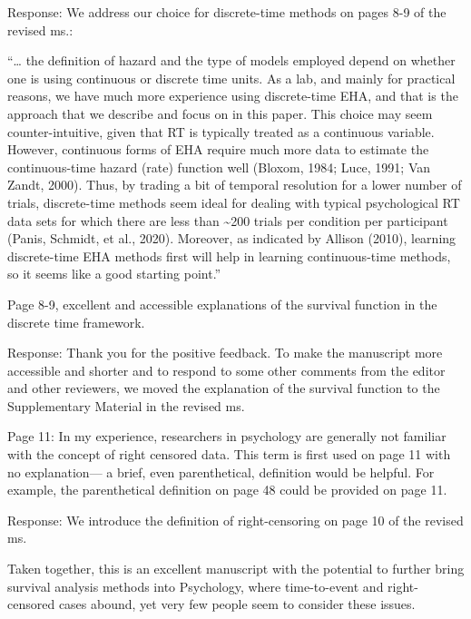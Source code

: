 \documentclass[
]{article}
\renewenvironment{quote}{\begin{leftbar}}{\end{leftbar}}
\begin{document}
Response: We address our choice for discrete-time methods on pages 8-9
of the revised ms.:

``\ldots{} the definition of hazard and the type of models employed
depend on whether one is using continuous or discrete time units. As a
lab, and mainly for practical reasons, we have much more experience
using discrete-time EHA, and that is the approach that we describe and
focus on in this paper. This choice may seem counter-intuitive, given
that RT is typically treated as a continuous variable. However,
continuous forms of EHA require much more data to estimate the
continuous-time hazard (rate) function well (Bloxom, 1984; Luce, 1991;
Van Zandt, 2000). Thus, by trading a bit of temporal resolution for a
lower number of trials, discrete-time methods seem ideal for dealing
with typical psychological RT data sets for which there are less than
\textasciitilde200 trials per condition per participant (Panis, Schmidt,
et al., 2020). Moreover, as indicated by Allison (2010), learning
discrete-time EHA methods first will help in learning continuous-time
methods, so it seems like a good starting point.''

\begin{quote}
Page 8-9, excellent and accessible explanations of the survival function
in the discrete time framework.
\end{quote}

Response: Thank you for the positive feedback. To make the manuscript
more accessible and shorter and to respond to some other comments from
the editor and other reviewers, we moved the explanation of the survival
function to the Supplementary Material in the revised ms.

\begin{quote}
Page 11: In my experience, researchers in psychology are generally not
familiar with the concept of right censored data. This term is first
used on page 11 with no explanation--- a brief, even parenthetical,
definition would be helpful. For example, the parenthetical definition
on page 48 could be provided on page 11.
\end{quote}

Response: We introduce the definition of right-censoring on page 10 of
the revised ms.

\begin{quote}
Taken together, this is an excellent manuscript with the potential to
further bring survival analysis methods into Psychology, where
time-to-event and right-censored cases abound, yet very few people seem
to consider these issues.
\end{quote}
\end{document}
